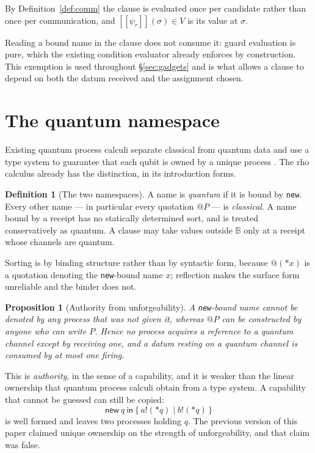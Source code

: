 \documentclass[11pt,a4paper]{article}
\theoremstyle{plain}
\newtheorem{proposition}[theorem]{Proposition}
\theoremstyle{definition}
\newtheorem{definition}[theorem]{Definition}
\theoremstyle{remark}
\newcommand{\sem}[1]{[\![#1]\!]}
\newcommand{\Bool}{\mathbb{B}}
\begin{document}
By Definition~\ref{def:comm} the clause is evaluated once per candidate rather
than once per communication, and $\sem{\psi_r}(\sigma) \in V$ is its value at
$\sigma$.

Reading a bound name in the clause does not consume it: guard evaluation is
pure, which the existing condition evaluator already enforces by construction.
This exemption is used throughout \S\ref{sec:gadgets} and is what allows a
clause to depend on both the datum received and the assignment chosen.

\section{The quantum namespace}\label{sec:namespace}

Existing quantum process calculi separate classical from quantum data and use a
type system to guarantee that each qubit is owned by a unique process
\cite{GayNagarajanCQP,GayNagarajanTypes}. The rho calculus already has the
distinction, in its introduction forms.

\begin{definition}[The two namespaces]\label{def:namespace}
A name is \emph{quantum} if it is bound by \texttt{new}. Every other name --- in
particular every quotation $@P$ --- is \emph{classical}. A name bound by a
receipt has no statically determined sort, and is treated conservatively as
quantum. A clause may take values outside $\Bool$ only at a receipt whose
channels are quantum.
\end{definition}

Sorting is by binding structure rather than by syntactic form, because $@(*x)$
is a quotation denoting the \texttt{new}-bound name $x$; reflection makes the
surface form unreliable and the binder does not.

\begin{proposition}[Authority from unforgeability]\label{prop:ownership}
A \texttt{new}-bound name cannot be denoted by any process that was not given
it, whereas $@P$ can be constructed by anyone who can write $P$. Hence no
process acquires a reference to a quantum channel except by receiving one, and a
datum resting on a quantum channel is consumed by at most one firing.
\end{proposition}

This is \emph{authority}, in the sense of a capability, and it is weaker than
the linear ownership that quantum process calculi obtain from a type system. A
capability that cannot be guessed can still be copied:
\[
  \textsf{new}\ q\ \textsf{in}\ \{\, a!({*}q) \mid b!({*}q) \,\}
\]
is well formed and leaves two processes holding $q$. The previous version of
this paper claimed unique ownership on the strength of unforgeability, and that
claim was false.
\end{document}
